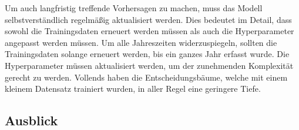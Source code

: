 \documentclass[12pt, a4paper]{article}
\begin{document}
Um auch langfristig treffende Vorhersagen zu machen, muss das Modell selbstverständlich regelmäßig aktualisiert werden. Dies bedeutet im Detail, dass sowohl die Trainingsdaten erneuert werden müssen als auch die Hyperparameter angepasst werden müssen. Um alle Jahreszeiten widerzuspiegeln, sollten die Trainingsdaten solange erneuert werden, bis ein ganzes Jahr erfasst wurde. Die Hyperparameter müssen aktualisiert werden, um der zunehmenden Komplexität gerecht zu werden. Vollends haben die Entscheidungsbäume, welche mit einem kleinem Datensatz trainiert wurden, in aller Regel eine geringere Tiefe.



\newpage

\subsection{Ausblick}
\label{subsec:outlook}
\end{document}
